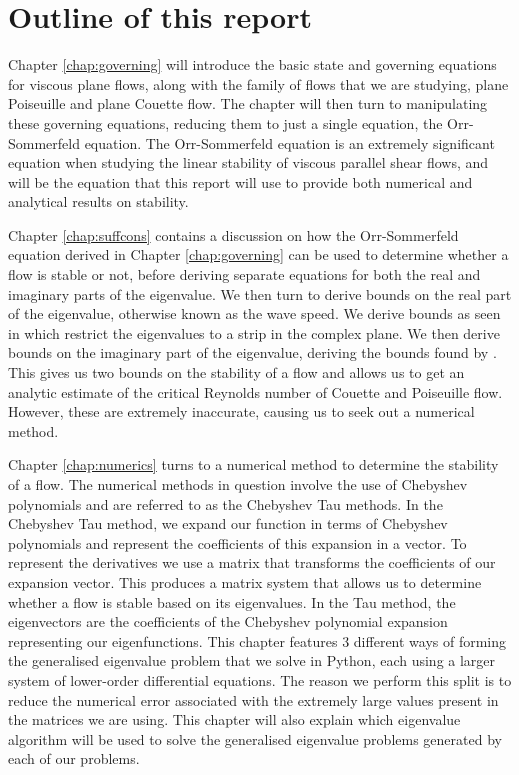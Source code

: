 \section{Outline of this report}
Chapter \ref{chap:governing} will introduce the basic state and governing equations for viscous plane flows, along with the family of flows that we are studying, plane Poiseuille and plane Couette flow. The chapter will then turn to manipulating these governing equations, reducing them to just a single equation, the Orr-Sommerfeld equation. The Orr-Sommerfeld equation is an extremely significant equation when studying the linear stability of viscous parallel shear flows, and will be the equation that this report will use to provide both numerical and analytical results on stability.

Chapter \ref{chap:suffcons} contains a discussion on how the Orr-Sommerfeld equation derived in Chapter \ref{chap:governing} can be used to determine whether a flow is stable or not, before deriving separate equations for both the real and imaginary parts of the eigenvalue. We then turn to derive bounds on the real part of the eigenvalue, otherwise known as the wave speed. We derive bounds as seen in \citet{pai1954generalization, joseph1968eigenvalue} which restrict the eigenvalues to a strip in the complex plane. We then derive bounds on the imaginary part of the eigenvalue, deriving the bounds found by \citet{synge1938hydrodynamical, joseph1968eigenvalue, joseph1969eigenvalue}. This gives us two bounds on the stability of a flow and allows us to get an analytic estimate of the critical Reynolds number of Couette and Poiseuille flow. However, these are extremely inaccurate, causing us to seek out a numerical method.

Chapter \ref{chap:numerics} turns to a numerical method to determine the stability of a flow. The numerical methods in question involve the use of Chebyshev polynomials and are referred to as the Chebyshev Tau methods. In the Chebyshev Tau method, we expand our function in terms of Chebyshev polynomials and represent the coefficients of this expansion in a vector. To represent the derivatives we use a matrix that transforms the coefficients of our expansion vector. This produces a matrix system that allows us to determine whether a flow is stable based on its eigenvalues. In the Tau method, the eigenvectors are the coefficients of the Chebyshev polynomial expansion representing our eigenfunctions. This chapter features 3 different ways of forming the generalised eigenvalue problem that we solve in Python, each using a larger system of lower-order differential equations. The reason we perform this split is to reduce the numerical error associated with the extremely large values present in the matrices we are using. This chapter will also explain which eigenvalue algorithm will be used to solve the generalised eigenvalue problems generated by each of our problems.

